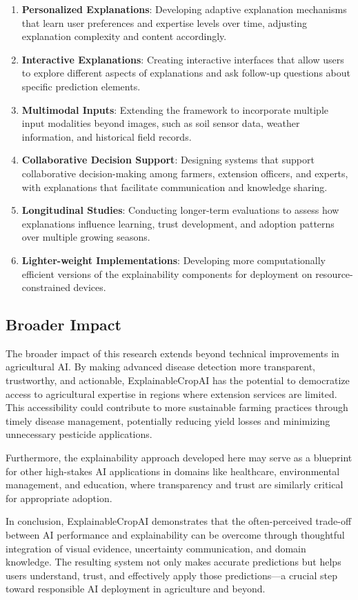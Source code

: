 \begin{enumerate}
    \item \textbf{Personalized Explanations}: Developing adaptive explanation mechanisms that learn user preferences and expertise levels over time, adjusting explanation complexity and content accordingly.
    
    \item \textbf{Interactive Explanations}: Creating interactive interfaces that allow users to explore different aspects of explanations and ask follow-up questions about specific prediction elements.
    
    \item \textbf{Multimodal Inputs}: Extending the framework to incorporate multiple input modalities beyond images, such as soil sensor data, weather information, and historical field records.
    
    \item \textbf{Collaborative Decision Support}: Designing systems that support collaborative decision-making among farmers, extension officers, and experts, with explanations that facilitate communication and knowledge sharing.
    
    \item \textbf{Longitudinal Studies}: Conducting longer-term evaluations to assess how explanations influence learning, trust development, and adoption patterns over multiple growing seasons.
    
    \item \textbf{Lighter-weight Implementations}: Developing more computationally efficient versions of the explainability components for deployment on resource-constrained devices.
\end{enumerate}

\subsection{Broader Impact}

The broader impact of this research extends beyond technical improvements in agricultural AI. By making advanced disease detection more transparent, trustworthy, and actionable, ExplainableCropAI has the potential to democratize access to agricultural expertise in regions where extension services are limited. This accessibility could contribute to more sustainable farming practices through timely disease management, potentially reducing yield losses and minimizing unnecessary pesticide applications.

Furthermore, the explainability approach developed here may serve as a blueprint for other high-stakes AI applications in domains like healthcare, environmental management, and education, where transparency and trust are similarly critical for appropriate adoption.

In conclusion, ExplainableCropAI demonstrates that the often-perceived trade-off between AI performance and explainability can be overcome through thoughtful integration of visual evidence, uncertainty communication, and domain knowledge. The resulting system not only makes accurate predictions but helps users understand, trust, and effectively apply those predictions—a crucial step toward responsible AI deployment in agriculture and beyond.
